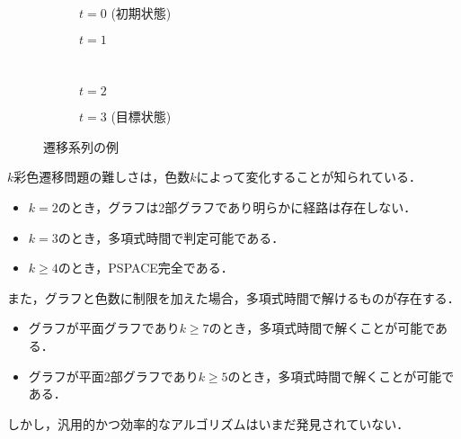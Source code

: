 \begin{figure}[htbp]
  \centering
  \begin{subfigure}{0.4\hsize}
    \centering
    
    \caption{$t=0$ (初期状態)}
   \end{subfigure}
   \hspace{1cm}
   \begin{subfigure}{0.4\hsize}
    \centering
    
    \caption{$t=1$}
   \end{subfigure}
   \\
   \begin{subfigure}{0.4\hsize}
    \centering
    
    \caption{$t=2$}
   \end{subfigure}
   \hspace{1cm}
   \begin{subfigure}{0.4\hsize}
    \centering
    
    \caption{$t=3$ (目標状態)}
   \end{subfigure}

   \caption{遷移系列の例}
   \label{fig:ans_varrecol}
\end{figure}

$k$彩色遷移問題の難しさは，色数$k$によって変化することが知られている． 
\begin{itemize}
  \item $k = 2$のとき，グラフは2部グラフであり明らかに経路は存在しない． \cite{CHM2011:JGT}
  \item $k = 3$のとき，多項式時間で判定可能である． \cite{CHM2011:JGT}
  \item $k \geq 4$のとき，PSPACE完全である． \cite{BC2009:tcs}
\end{itemize}
また，グラフと色数に制限を加えた場合，多項式時間で解けるものが存在する． \cite{BC2009:tcs}
\begin{itemize}
  \item グラフが平面グラフであり$k \geq 7$のとき，多項式時間で解くことが可能である．
  \item グラフが平面2部グラフであり$k \geq 5$のとき，多項式時間で解くことが可能である．
\end{itemize}
しかし，汎用的かつ効率的なアルゴリズムはいまだ発見されていない．

